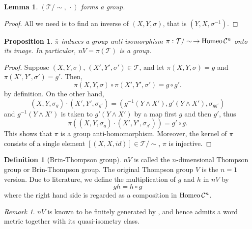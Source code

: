 \documentclass[12pt,reqno]{amsart}
\theoremstyle{plain}
\newtheorem{lemma}[theorem]{Lemma}
\newtheorem{proposition}[theorem]{Proposition}
\theoremstyle{definition}
\newtheorem{definition}{Definition}[section]
\theoremstyle{remark}
\newtheorem{remark}{Remark}[section]
\numberwithin{equation}{section}
\begin{document}
\begin{lemma} 
	$(\mathcal{T}/\sim, \, \cdot)$  forms a group.  
\end{lemma} 
\begin{proof} 
	All we need is to find an inverse of  $(X, Y, \sigma)$, 
	that is  $(Y, X, \sigma^{-1})$.  
\end{proof} 


\begin{proposition} 
	$\bar{\pi}$  induces a group anti-isomorphism  
	$\pi : \mathcal{T}/\sim \, \to {\rm Homeo} \, \mathcal{C}^n$  
	onto its image.   
	In particular, 
	$nV = \pi(\mathcal{T})$  is a group.  
\end{proposition} 
\begin{proof} 
	Suppose  $(X, Y, \sigma), \,  (X', Y', \sigma') \in \mathcal{T}$,   
	and let  $\pi(X, Y, \sigma) = g$  and  $\pi(X', Y', \sigma') = g'$.      
	Then, 
	\begin{equation*} 
		\pi(X, Y, \sigma) \circ \pi(X',Y', \sigma') = g \circ g'.  
	\end{equation*} 
	by definition.  
	On the other hand, 
	\begin{equation*}
	        (X, Y, \sigma_g) \cdot  (X', Y', \sigma_{g'}) 
	        = (g^{-1}(Y \wedge X'), g'(Y \wedge X'), \sigma_{gg'})  
	\end{equation*} 
	and 
	$g^{-1}(Y \wedge X') $ is taken to $g'(Y \wedge X')$  by 
	a map first  $g$  and then  $g'$, 
	thus 
	\begin{equation*} 
		\pi((X, Y, \sigma_g) \cdot  (X', Y', \sigma_{g'})) = g' \circ g.  
	\end{equation*}  
	This shows that  $\pi$  is a group anti-homomorphism.  
	Moreover, 
	the kernel of  $\pi$  consists of a single element  $[(X, X, id)] \in \mathcal{T}/\sim$, 
	$\pi$  is injective.  
\end{proof} 

\begin{definition}[Brin-Thompson group]
	$nV$  is called the $n$-dimensional Thompson group 
	or Brin-Thompson group.  
	The original Thompson group  $V$  is the  $n = 1$ version.  
	Due to literature, 
	we define the multiplication of  $g$  and  $h$  in  $nV$  by 
	\begin{equation*} 
		gh = h \circ g 
	\end{equation*} 
	where the right hand side is regarded as a composition  
	in  ${\rm Homeo} \, \mathcal{C}^n$.  
\end{definition} 

\begin{remark} 
	$nV$  is known to be finitely generated by  \cite{Brin}, 
	and hence admits a word metric together with its quasi-isometry class.  
\end{remark} 
\end{document}
